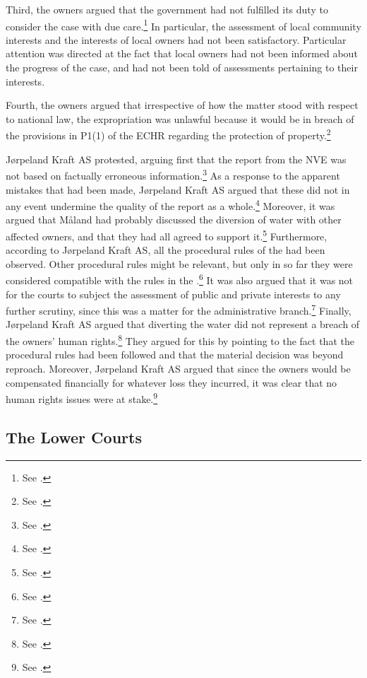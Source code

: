 Third, the owners argued that the government had not fulfilled its duty to consider the case with due care.\footnote{See \cite[12]{jorpeland09}.} In particular, the assessment of local community interests and the interests of local owners had not been satisfactory. Particular attention was directed at the fact that local owners had not been informed about the progress of the case, and had not been told of assessments pertaining to their interests.

Fourth, the owners argued that irrespective of how the matter stood with respect to national law, the expropriation was unlawful because it would be in breach of the provisions in P1(1) of the ECHR regarding the protection of property.\footnote{See \cite[07-08]{jorpeland09}.}

Jørpeland Kraft AS protested, arguing first that the report from the NVE was not based on factually erroneous information.\footnote{See \cite[16]{jorpeland11}.} As a response to the apparent mistakes that had been made, Jørpeland Kraft AS argued that these did not in any event undermine the quality of the report as a whole.\footnote{See \cite[2]{jorpeland11a)}.} Moreover, it was argued that Måland had probably discussed the diversion of water with other affected owners, and that they had all agreed to support it.\footnote{See \cite[2]{jorpeland11a}.} Furthermore, according to Jørpeland Kraft AS, all the procedural rules of the \cite{wra17} had been observed. Other procedural rules might be relevant, but only in so far they were considered compatible with the rules in the \cite{wra17}.\footnote{See \cite[16]{jorpeland11}.} It was also argued that it was not for the courts to subject the assessment of public and private interests to any further scrutiny, since this was a matter for the administrative branch.\footnote{See \cite[2]{jorpeland11a}.} Finally, Jørpeland Kraft AS argued that diverting the water did not represent a breach of the owners' human rights.\footnote{See \cite[2]{jorpeland11a}.} They argued for this by pointing to the fact that the procedural rules had been followed and that the material decision was beyond reproach. Moreover, Jørpeland Kraft AS argued that since the owners would be compensated financially for whatever loss they incurred, it was clear that no human rights issues were at stake.\footnote{See \cite[2]{jorpeland11a}.}

\subsection{The Lower Courts}\label{sec:5:6:3}

